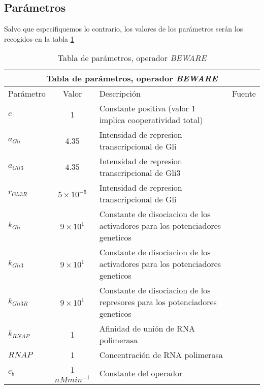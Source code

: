 \subsection{Parámetros}
Salvo que especifiquemos lo contrario, los valores de los parámetros serán los recogidos en la tabla \ref{beware_params}
\begin{table}[h]
	\begin{center}
		
		\begin{tabular}{ |p{3cm}||c|p{3cm}|p{3cm}|  }
			\hline
			\multicolumn{4}{|c|}{Tabla de parámetros, operador \textit{BEWARE}} \\
			\hline
			Parámetro & Valor & Descripción & Fuente\\
			\hline
			$c $  & 1    &\tiny{Constante positiva (valor 1 implica cooperatividad total)} &   \cite{cambon1}\\
			$a_{Gli}$ &   4.35  & \tiny{Intensidad de represion transcripcional de Gli}   & \cite{cambon1}\\
			$a_{Gli3} $ & $4.35$ & \tiny{ Intensidad de represion transcripcional de Gli3 } &  \cite{cambon1}\\
			$r_{Gli3R}$   &$5\times10^{-5}$ & \tiny{ Intensidad de represion transcripcional de Gli } &  \cite{cambon1}\\
			$k_{Gli}$ &  $9\times10^{1}$  & \tiny{ Constante de disociacion de los activadores para los potenciadores geneticos } & \cite{cambon1}\\
			$k_{Gli3}$ & $9\times10^{1}$  & \tiny{ Constante de disociacion de los activadores para los potenciadores geneticos }   & \cite{cambon1}\\
			$k_{Gli3R}$ & $9\times10^{1}$ & \tiny{ Constante de disociacion de los represores para los potenciadores geneticos }   & \cite{cambon1}\\
			
			$k_{RNAP}$& 1  &  \tiny{Afinidad de unión   de RNA polimerasa} & \cite{cambon1}\\
			$RNAP$& 1  & \tiny{Concentración de RNA polimerasa} & \cite{cambon1}\\
			$c_b$& 1 $ nMmin^{-1}$  & \tiny{ Constante del operador} & \cite{cambon1}\\
			\hline
		\end{tabular}
		
	\end{center}
	\caption{Tabla de parámetros, operador \textit{BEWARE}}\label{beware_params}
\end{table}

